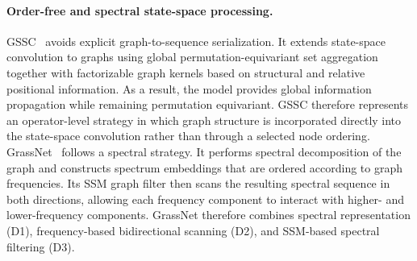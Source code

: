 \documentclass[acmsmall]{acmart}
\begin{document}
\paragraph{\textbf{Order-free and spectral state-space processing.}}
GSSC~\cite{huang2024can} avoids explicit graph-to-sequence serialization.
It extends state-space convolution to graphs using global
permutation-equivariant set aggregation together with factorizable graph
kernels based on structural and relative positional information. As a result,
the model provides global information propagation while remaining
permutation equivariant. GSSC therefore represents an operator-level strategy
in which graph structure is incorporated directly into the state-space
convolution rather than through a selected node ordering.
GrassNet~\cite{zhao2024grassnet} follows a spectral strategy. It performs
spectral decomposition of the graph and constructs spectrum embeddings that
are ordered according to graph frequencies. Its SSM graph filter then scans
the resulting spectral sequence in both directions, allowing each frequency
component to interact with higher- and lower-frequency components. GrassNet
therefore combines spectral representation (D1), frequency-based
bidirectional scanning (D2), and SSM-based spectral filtering (D3).
\end{document}
